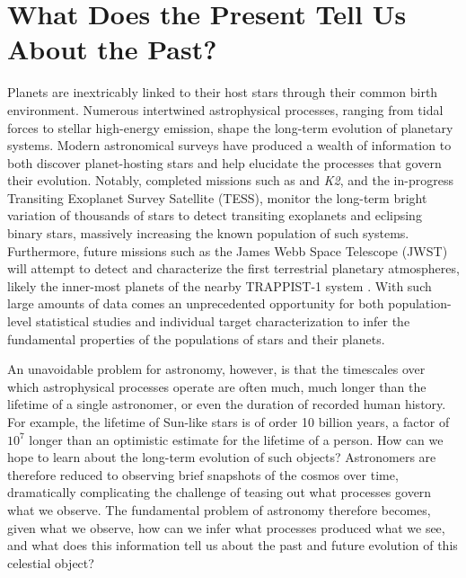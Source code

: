 
\section{What Does the Present Tell Us About the Past?}

Planets are inextricably linked to their host stars through their common birth environment.  Numerous intertwined astrophysical processes, ranging from tidal forces to stellar high-energy emission, shape the long-term evolution of planetary systems. Modern astronomical surveys have produced a wealth of information to both discover planet-hosting stars and help elucidate the processes that govern their evolution. Notably, completed missions such as \kepler and \textit{K2}, and the in-progress Transiting Exoplanet Survey Satellite (TESS), monitor the long-term bright variation of thousands of stars to detect transiting exoplanets and eclipsing binary stars, massively increasing the known population of such systems.  Furthermore, future missions such as the James Webb Space Telescope (JWST) will attempt to detect and characterize the first terrestrial planetary atmospheres, likely the inner-most planets of the nearby TRAPPIST-1 system \citep{Lustig2019}. With such large amounts of data comes an unprecedented opportunity for both population-level statistical studies and individual target characterization to infer the fundamental properties of the populations of stars and their planets.

An unavoidable problem for astronomy, however, is that the timescales over which astrophysical processes operate are often much, much longer than the lifetime of a single astronomer, or even the duration of recorded human history. For example, the lifetime of Sun-like stars is of order 10 billion years, a factor of $10^7$ longer than an optimistic estimate for the lifetime of a person. How can we hope to learn about the long-term evolution of such objects? Astronomers are therefore reduced to observing brief snapshots of the cosmos over time, dramatically complicating the challenge of teasing out what processes govern what we observe. The fundamental problem of astronomy therefore becomes, given what we observe, how can we infer what processes produced what we see, and what does this information tell us about the past and future evolution of this celestial object? 

